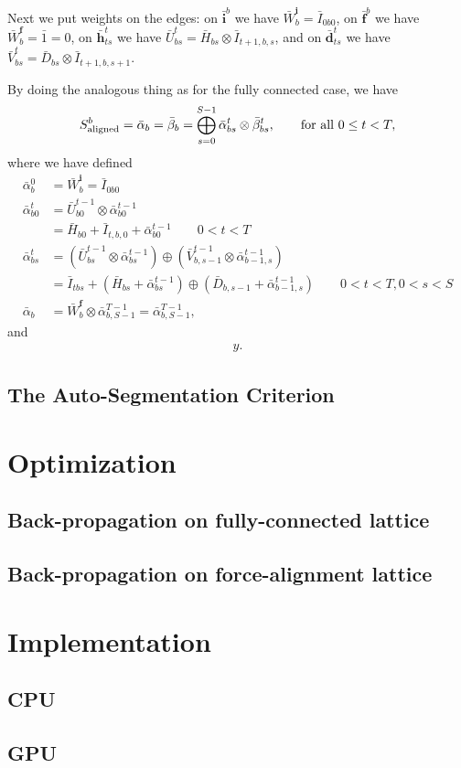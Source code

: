 \documentclass[a4paper]{article}
\begin{document}
Next we put weights on the edges: on $\bar{\mathbf{i}}^b$ we have $\bar{W}^{\mathbf{i}}_b=\bar{I}_{0b0}$, on $\bar{\mathbf{f}}^b$ we have $\bar{W}^{\mathbf{f}}_b=\bar{1}=0$, on $\bar{\mathbf{h}}^t_{ts}$ we have $\bar{U}^t_{bs}=\bar{H}_{bs}\otimes\bar{I}_{t+1,b,s}$, and on $\bar{\mathbf{d}}^t_{ts}$ we have $\bar{V}^t_{bs}=\bar{D}_{bs}\otimes\bar{I}_{t+1,b, s+1}$.

By doing the analogous thing as for the fully connected case, we have
\begin{equation}
S^b_{\rm{aligned}} = \bar\alpha_b = \bar\beta_b = \bigoplus_{s=0}^{S-1}\bar\alpha^t_{bs}\otimes \bar\beta^t_{bs},\qquad \textrm{for all } 0 \leq t < T,
\end{equation}
where we have defined
\begin{align}
\bar\alpha^0_{b} &= \bar{W}^{\mathbf{i}}_{b} =\bar{I}_{0b0} \\
\bar\alpha^t_{b0} &= \bar{U}^{t-1}_{b0}\otimes\bar\alpha^{t-1}_{b0} 
\\
&=\bar{H}_{b0}+\bar{I}_{t,b,0}+\bar\alpha^{t-1}_{b0} \qquad 0<t<T \\
\bar\alpha^t_{bs} &= (\bar{U}^{t-1}_{bs} \otimes\bar\alpha^{t-1}_{bs})\oplus (\bar{V}^{t-1}_{b,s-1} \otimes\bar\alpha^{t-1}_{b-1,s}) \\
&= \bar{I}_{tbs} + (\bar{H}_{bs} + \bar\alpha^{t-1}_{bs})\oplus (\bar{D}_{b, s-1} + \bar\alpha^{t-1}_{b-1,s}) \qquad 0 < t < T, 0<s<S \\
\bar\alpha_b &= \bar{W}^{\mathbf{f}}_{b} \otimes \bar\alpha^{T-1}_{b,S-1} = \bar\alpha^{T-1}_{b,S-1},
\end{align}
and
\begin{align}
y.
\end{align}

\subsection{The Auto-Segmentation Criterion}

\section{Optimization}

\subsection{Back-propagation on fully-connected lattice}

\subsection{Back-propagation on force-alignment lattice}

\section{Implementation}

\subsection{CPU}

\subsection{GPU}
\end{document}
